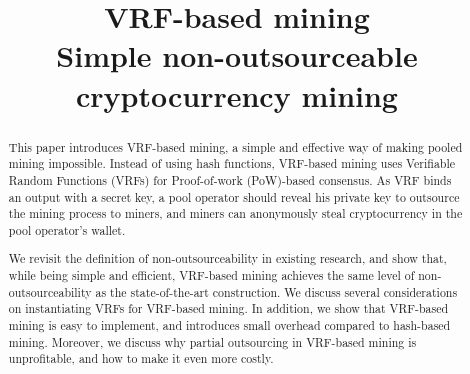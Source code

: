 \documentclass[conference]{IEEEtran}
\begin{document}
\title{VRF-based mining\\
\LARGE Simple non-outsourceable cryptocurrency mining}


\maketitle

\begin{abstract}
  This paper introduces VRF-based mining, a simple and effective way of making pooled mining impossible.
  Instead of using hash functions, VRF-based mining uses Verifiable Random Functions (VRFs) for Proof-of-work (PoW)-based consensus.
  As VRF binds an output with a secret key, a pool operator should reveal his private key to outsource the mining process to miners, and miners can anonymously steal cryptocurrency in the pool operator's wallet.
  
  We revisit the definition of non-outsourceability in existing research, and show that, while being simple and efficient, VRF-based mining achieves the same level of non-outsourceability as the state-of-the-art construction.
  We discuss several considerations on instantiating VRFs for VRF-based mining.
  In addition, we show that VRF-based mining is easy to implement, and introduces small overhead compared to hash-based mining.
  Moreover, we discuss why partial outsourcing in VRF-based mining is unprofitable, and how to make it even more costly.
\end{abstract}















\appendix

\end{document}

